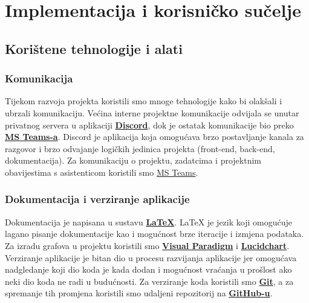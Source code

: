 \chapter{Implementacija i korisničko sučelje}
		
		
		\section{Korištene tehnologije i alati}
			
		\subsection*{Komunikacija}
			Tijekom razvoja projekta koristili smo mnoge tehnologije kako bi olakšali i ubrzali komunikaciju. Većina interne projektne komunikacije odvijala se unutar privatnog servera u aplikaciji \textbf{\href{https://discord.com/}{Discord}}, dok je ostatak komunikacije bio preko \textbf{\href{https://www.microsoft.com/hr-hr/microsoft-teams/download-app}{MS Teams-a}}.
			Discord je aplikacija koja omogućava brzo postavljanje kanala za razgovor i brzo odvajanje logičkih jedinica projekta (front-end, back-end, dokumentacija).
			Za komunikaciju o projektu, zadatcima i projektnim obavijestima s asistenticom koristili smo \href{https://www.microsoft.com/hr-hr/microsoft-teams/download-app}{MS Teams}.


		\subsection*{Dokumentacija i verziranje aplikacije}
			Dokumentacija je napisana u sustavu \textbf{\href{https://www.latex-project.org/}{LaTeX}}. {LaTeX} je jezik koji omogućuje lagano pisanje dokumentacije kao i mogućnost brze iteracije i izmjena podataka. Za izradu grafova u projektu koristili smo \textbf{\href{https://www.visual-paradigm.com/}{Visual Paradigm}} i \textbf{\href{https://www.lucidchart.com/pages/}{Lucidchart}}. Verziranje aplikacije je bitan dio u procesu razvijanja aplikacije jer omogućava nadgledanje koji dio koda je kada dodan i mogućnost vraćanja u prošlost ako neki dio koda ne radi u budućnosti. Za verziranje koda koristili smo \textbf{\href{https://git-scm.com/}{Git}}, a za spremanje tih promjena koristili smo udaljeni repozitorij na \textbf{\href{https://github.com/}{GitHub-u}}.

